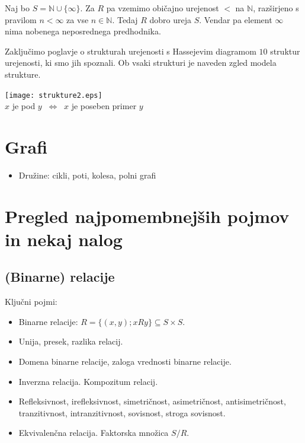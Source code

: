 \documentclass[11pt,paper=b5,footinclude,headinclude]{scrbook} %
\newcounter{example}
\def\cee {{~\Leftrightarrow~}}
\begin{document}
\bigskip
\begin{example*}
Naj bo $S = \mathbb{N}\cup\{\infty\}$. Za $R$ pa vzemimo običajno urejenost $<$ na $\mathbb{N}$, razširjeno s pravilom $n<\infty$ za vse $n\in \mathbb{N}$. Tedaj $R$ dobro ureja $S$. Vendar pa element $\infty$ nima nobenega neposrednega predhodnika.\end{example*}


Zaključimo poglavje o strukturah urejenosti s Hassejevim diagramom $10$ struktur urejenosti, ki smo jih spoznali.
Ob vsaki strukturi je naveden zgled modela strukture.

\begin{center}
\texttt{[image: strukture2.eps]}
~~\\
$x$ je pod $y$ $\cee$ $x$ je poseben primer $y$
\end{center}

\section{Grafi}

\begin{itemize}
    \item Družine: cikli, poti, kolesa, polni grafi
    
\end{itemize}

\section{Pregled najpomembnejših pojmov in nekaj nalog}


\subsection{(Binarne) relacije}

Ključni pojmi:
\begin{itemize}
  \item Binarne relacije:
  $R = \{(x,y) ; xRy \}\subseteq S\times S$.
  \item Unija, presek, razlika relacij.
  \item Domena binarne relacije, zaloga vrednosti binarne relacije.
  \item Inverzna relacija. Kompozitum relacij.
\item Refleksivnost, irefleksivnost, simetričnost, asimetričnost, antisimetričnost, tranzitivnost, intranzitivnost,
sovisnost, stroga sovisnost.
\item Ekvivalenčna relacija. Faktorska množica $S/R$.
\end{itemize}
\end{document}
